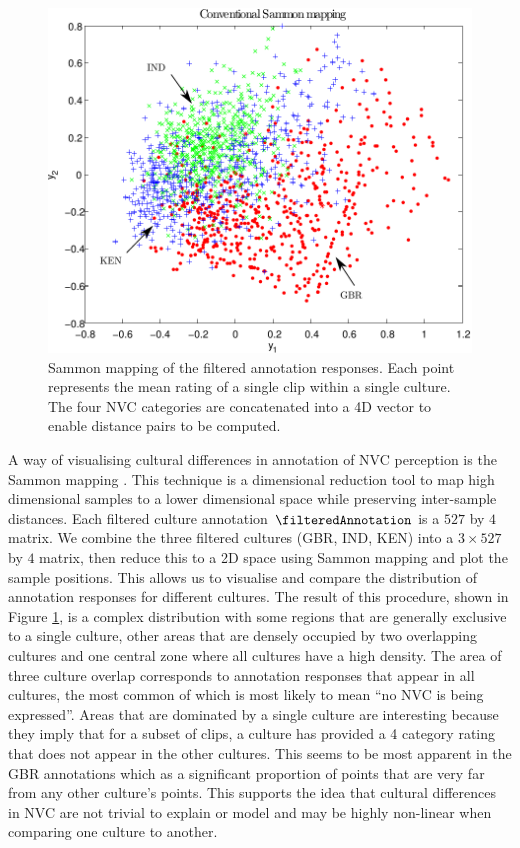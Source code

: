 \begin{figure}
\centering
\includegraphics[width = 0.78 \columnwidth]{annotation/Sammon3Culture.pdf}
\caption{Sammon mapping of the filtered annotation responses. Each point represents the mean rating of a single clip within a single culture. The four \ac{NVC} categories are concatenated into a 4{D} vector to enable distance pairs to be computed.}
\label{CultureSammonMapping}
\end{figure}

A way of visualising cultural differences in annotation of \ac{NVC} perception is the Sammon mapping \cite{Sammon1969}. This technique is a dimensional reduction tool to map high dimensional samples to a lower dimensional space while preserving inter-sample distances. Each filtered culture annotation $\filteredAnnotation$ is a $527$ by $4$ matrix. We combine the three filtered cultures (GBR, IND, KEN) into a $3 \times 527$ by $4$ matrix, then reduce this to a 2{D} space using Sammon mapping and plot the sample positions. This allows us to visualise and compare the distribution of annotation responses for different cultures. The result of this procedure, shown in Figure \ref{CultureSammonMapping}, is a complex distribution with some regions that are generally exclusive to a single culture, other areas that are densely occupied by two overlapping cultures and one central zone where all cultures have a high density. The area of three culture overlap corresponds to annotation responses that appear in all cultures, the most common of which is most likely to mean ``no \ac{NVC} is being expressed''. Areas that are dominated by a single culture are interesting because they imply that for a subset of clips, a culture has provided a 4 category rating that does not appear in the other cultures. This seems to be most apparent in the GBR annotations which as a significant proportion of points that are very far from any other culture's points. This supports the idea that cultural differences in \ac{NVC} are not trivial to explain or model and may be highly non-linear when comparing one culture to another. 

